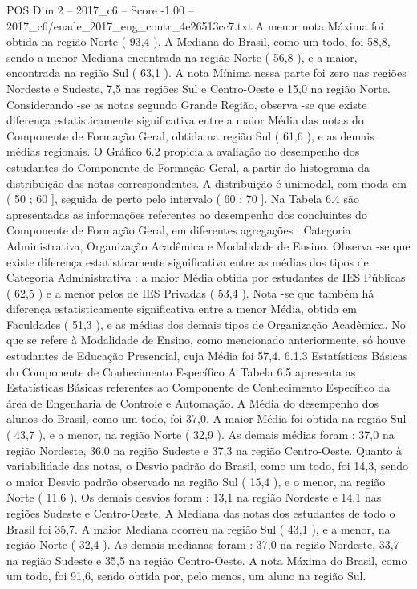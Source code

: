 \begin{textsample}{POS Dim 2 – 2017\_c6 – Score -1.00 – 2017\_c6/enade\_2017\_eng\_contr\_4e26513cc7.txt}
A menor nota Máxima foi obtida na região Norte ( 93,4 ).
A Mediana do Brasil, como um todo, foi 58,8, sendo a menor Mediana encontrada na região Norte ( 56,8 ), e a maior, encontrada na região Sul ( 63,1 ).
A nota Mínima nessa parte foi zero nas regiões Nordeste e Sudeste, 7,5 nas regiões Sul e Centro-Oeste e 15,0 na região Norte.
Considerando -se as notas segundo Grande Região, observa -se que existe diferença estatisticamente significativa entre a maior Média das notas do Componente de Formação Geral, obtida na região Sul ( 61,6 ), e as demais médias regionais.
O Gráfico 6.2 propicia a avaliação do desempenho dos estudantes do Componente de Formação Geral, a partir do histograma da distribuição das notas correspondentes.
A distribuição é unimodal, com moda em ( 50 ; 60 ], seguida de perto pelo intervalo ( 60 ; 70 ].
Na Tabela 6.4 são apresentadas as informações referentes ao desempenho dos concluintes do Componente de Formação Geral, em diferentes agregações : Categoria Administrativa, Organização Acadêmica e Modalidade de Ensino.
Observa -se que existe diferença estatisticamente significativa entre as médias dos tipos de Categoria Administrativa : a maior Média obtida por estudantes de IES Públicas ( 62,5 ) e a menor pelos de IES Privadas ( 53,4 ).
Nota -se que também há diferença estatisticamente significativa entre a menor Média, obtida em Faculdades ( 51,3 ), e as médias dos demais tipos de Organização Acadêmica.
No que se refere à Modalidade de Ensino, como mencionado anteriormente, só houve estudantes de Educação Presencial, cuja Média foi 57,4. 6.1.3 Estatísticas Básicas do Componente de Conhecimento Específico A Tabela 6.5 apresenta as Estatísticas Básicas referentes ao Componente de Conhecimento Específico da área de Engenharia de Controle e Automação.
A Média do desempenho dos alunos do Brasil, como um todo, foi 37,0.
A maior Média foi obtida na região Sul ( 43,7 ), e a menor, na região Norte ( 32,9 ).
As demais médias foram : 37,0 na região Nordeste, 36,0 na região Sudeste e 37,3 na região Centro-Oeste.
Quanto à variabilidade das notas, o Desvio padrão do Brasil, como um todo, foi 14,3, sendo o maior Desvio padrão observado na região Sul ( 15,4 ), e o menor, na região Norte ( 11,6 ).
Os demais desvios foram : 13,1 na região Nordeste e 14,1 nas regiões Sudeste e Centro-Oeste.
A Mediana das notas dos estudantes de todo o Brasil foi 35,7.
A maior Mediana ocorreu na região Sul ( 43,1 ), e a menor, na região Norte ( 32,4 ).
As demais medianas foram : 37,0 na região Nordeste, 33,7 na região Sudeste e 35,5 na região Centro-Oeste.
A nota Máxima do Brasil, como um todo, foi 91,6, sendo obtida por, pelo menos, um aluno na região Sul.

\end{textsample}
